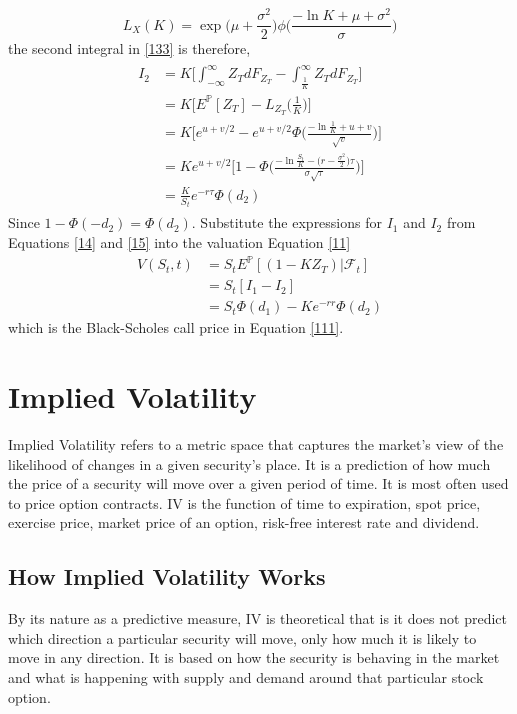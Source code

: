 \documentclass[a4 paper, 12pt]{report}
\theoremstyle{plain}
\newtheorem{definition}[theorem]{\textbf{Definition}}
\begin{document}
$$
L_X(K) = \exp\bigg(\mu + \frac{\sigma^2}{2}\bigg)\phi\bigg(\frac{-\ln K+\mu+\sigma^2}{\sigma}\bigg)
$$
the second integral in \eqref{133} is therefore,
\begin{align}\label{15}
\begin{split}
I_2 & = K\bigg[\int_{-\infty}^\infty Z_T dF_{Z_T} - \int_{\frac{1}{K}}^\infty Z_TdF_{Z_T}\bigg]\\
& = K\bigg[E^{\mathbb{P}}[Z_T] - L_{Z_T}\bigg(\frac{1}{K}\bigg)\bigg]\\
& = K\bigg[e^{u+v/2}-e^{u+v/2}\Phi\bigg(\frac{-\ln\frac{1}{K}+u+v}{\sqrt{v}}\bigg)\bigg]\\
& = Ke^{u+v/2}\bigg[1-\Phi\bigg(\frac{-\ln\frac{S_t}{K} - \bigg(r-\frac{\sigma^2}{2}\bigg)\tau}{\sigma\sqrt{\tau}}\bigg)\bigg]\\
& = \frac{K}{S_t}e^{-r\tau}\Phi(d_2)
\end{split}
\end{align}
Since $1-\Phi(-d_2) = \Phi(d_2)$. Substitute the expressions for $I_1$ and $I_2$ from Equations \eqref{14} and \eqref{15} into the valuation Equation \eqref{11}
\begin{align*}
V(S_t,t)& = S_tE^{\mathbb{P}}[(1-KZ_T)|\mathcal{F}_t]\\
& = S_t[I_1 - I_2]\\
& = S_t\Phi(d_1) - Ke^{-rr}\Phi(d_2)
\end{align*}
which is the Black-Scholes call price in Equation \eqref{111}.

\section{Implied Volatility}
\normalfont
\par Implied Volatility refers to a metric space that captures the market’s view of the likelihood of changes in a given security’s place. It is a prediction of how much the price of a security will move over a given period of time. It is most often used to price option contracts. IV is the function of time to expiration, spot price, exercise price, market price of an option, risk-free interest rate and dividend.

\subsection{How Implied Volatility Works}
\par By its nature as a predictive measure, IV is theoretical that is it does not predict which direction a particular security will move, only how much it is likely to move in any direction. It is based on how the security is behaving in the market and what is happening with supply and demand around that particular stock option.
\end{document}
